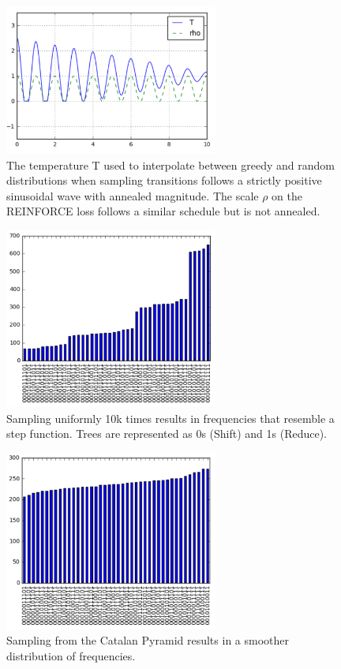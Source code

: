 \documentclass[11pt,a4paper]{article}
\begin{document}
\begin{figure}[H]
\centering
\includegraphics[width=7cm]{temperature_schedule}
\caption{The temperature T used to interpolate between greedy and random distributions when sampling transitions follows a strictly positive sinusoidal wave with annealed magnitude. The scale $\rho$ on the REINFORCE loss follows a similar schedule but is not annealed.}
\label{fig:schedule}
\end{figure}

\begin{figure}[H]
\centering
\includegraphics[width=7cm]{distribution_step}
\caption{Sampling uniformly 10k times results in frequencies that resemble a step function. Trees are represented as 0s (Shift) and 1s (Reduce).}
\label{fig:notuniform}
\end{figure}

\begin{figure}[H]
\centering
\includegraphics[width=7cm]{distribution_balanced}
\caption{Sampling from the Catalan Pyramid results in a smoother distribution of frequencies.}

\label{fig:uniform}
\end{figure}
\end{document}
